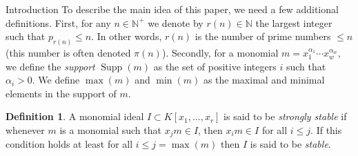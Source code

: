 \documentclass[reqno,10pt]{amsart}
\theoremstyle{definition}
\newtheorem{definition}{Definition}[section]
\theoremstyle{remark}
\theoremstyle{plain}
\newcommand{\Nat}{{\mathbb{N}}}
\newcommand{\M}{\mathcal{M}}
\newcommand{\supp}{\operatorname*{Supp}}
\begin{document}
\begin{section}{Introduction}
  To describe the main idea of this paper, we need a few additional
  definitions. First,  for any \(n \in \Nat^+\) we denote by \(r(n)
  \in \Nat\) the  largest integer such that \(p_{r(n)} \le n\). In
  other words, \(r(n)\)  is the number of prime numbers \(\le n\)
  (this number is often denoted \(\pi(n)\)).
  Secondly, for a
  monomial \(m = x_1^{\alpha_1}\cdots x_w^{\alpha_w}\), we define the
  \emph{support} \(\supp(m)\) as the set of positive 
  integers \(i\) such that \(\alpha_i > 0\). We define 
  \(\max(m)\) and \(\min(m)\) as the maximal and minimal elements in the
  support of \(m\).
  \begin{definition}\label{def:stab}
    A monomial ideal \(I \subset K[x_1,\dots,x_r]\) is said to be
    \emph{strongly 
    stable} if whenever \(m\) is a monomial such that \(x_j m \in I\),
    then \(x_i m \in I\) for all \(i \le j\). If this condition holds 
    at least for all \(i \le j=\max(m)\) then \(I\) is said to be
    \emph{stable}. 
  \end{definition}
  

\end{section}
\end{document}
